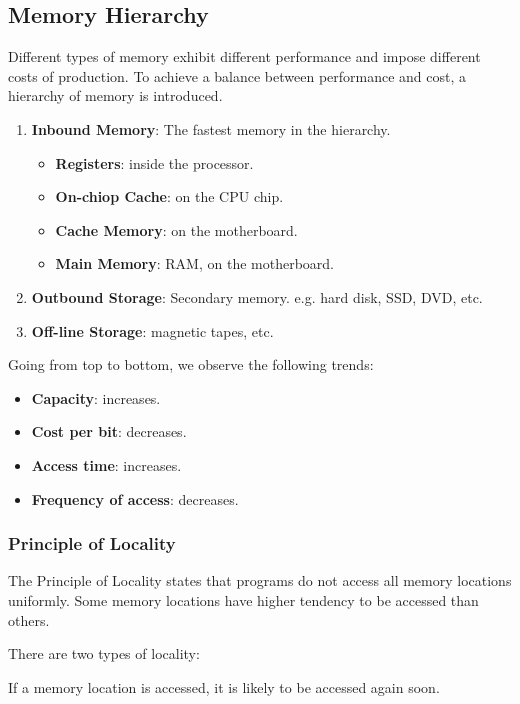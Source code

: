 \subsection{Memory Hierarchy}

Different types of memory exhibit different performance and impose different costs
of production. To achieve a balance between performance and cost, a hierarchy of
memory is introduced.

\begin{enumerate}
    \item \textbf{Inbound Memory}: The fastest memory in the hierarchy.
    \begin{itemize}
        \item \textbf{Registers}: inside the processor.
        \item \textbf{On-chiop Cache}: on the CPU chip.
        \item \textbf{Cache Memory}: on the motherboard.
        \item \textbf{Main Memory}: RAM, on the motherboard.
    \end{itemize}
    \item \textbf{Outbound Storage}: Secondary memory. e.g. hard disk, SSD, DVD, etc.
    \item \textbf{Off-line Storage}: magnetic tapes, etc.
\end{enumerate}

Going from top to bottom, we observe the following trends:
\begin{itemize}
    \item \textbf{Capacity}: increases.
    \item \textbf{Cost per bit}: decreases.
    \item \textbf{Access time}: increases.
    \item \textbf{Frequency of access}: decreases.
\end{itemize}

\subsubsection{Principle of Locality}

\begin{definition}
    The Principle of Locality states that programs do not access all memory locations
    uniformly. Some memory locations have higher tendency to be accessed than others.
\end{definition}

There are two types of locality:
\begin{definition}
    If a memory location is accessed, it is likely to be accessed again soon.
\end{definition}


